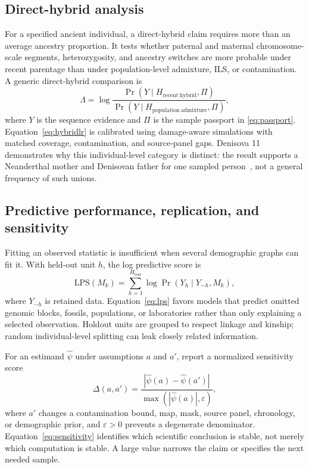 \documentclass[conference]{IEEEtran}
\begin{document}
\subsection{Direct-hybrid analysis}

For a specified ancient individual, a direct-hybrid claim requires more than an average ancestry proportion. It tests whether paternal and maternal chromosome-scale segments, heterozygosity, and ancestry switches are more probable under recent parentage than under population-level admixture, ILS, or contamination. A generic direct-hybrid comparison is
\begin{equation}
\label{eq:hybridlr}
\Lambda=\log\frac{\Pr(Y\mid H_{\mathrm{recent\ hybrid}},\Pi)}{\Pr(Y\mid H_{\mathrm{population\ admixture}},\Pi)},
\end{equation}
where $Y$ is the sequence evidence and $\Pi$ is the sample passport in \eqref{eq:passport}. Equation~\eqref{eq:hybridlr} is calibrated using damage-aware simulations with matched coverage, contamination, and source-panel gaps. Denisova 11 demonstrates why this individual-level category is distinct: the result supports a Neanderthal mother and Denisovan father for one sampled person~\cite{slon2018}, not a general frequency of such unions.

\subsection{Predictive performance, replication, and sensitivity}

Fitting an observed statistic is insufficient when several demographic graphs can fit it. With held-out unit $h$, the log predictive score is
\begin{equation}
\label{eq:lps}
\mathrm{LPS}(M_k)=\sum_{h=1}^{H_{\mathrm{test}}}\log \Pr(Y_h\mid Y_{-h},M_k),
\end{equation}
where $Y_{-h}$ is retained data. Equation~\eqref{eq:lps} favors models that predict omitted genomic blocks, fossils, populations, or laboratories rather than only explaining a selected observation. Holdout units are grouped to respect linkage and kinship; random individual-level splitting can leak closely related information.

For an estimand $\widehat{\psi}$ under assumptions $a$ and $a'$, report a normalized sensitivity score
\begin{equation}
\label{eq:sensitivity}
\Delta(a,a')=\frac{\left|\widehat{\psi}(a)-\widehat{\psi}(a')\right|}{\max\left(\left|\widehat{\psi}(a)\right|,\varepsilon\right)},
\end{equation}
where $a'$ changes a contamination bound, map, mask, source panel, chronology, or demographic prior, and $\varepsilon>0$ prevents a degenerate denominator. Equation~\eqref{eq:sensitivity} identifies which scientific conclusion is stable, not merely which computation is stable. A large value narrows the claim or specifies the next needed sample.
\end{document}
